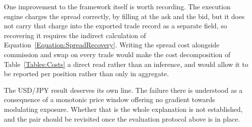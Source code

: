 One improvement to the framework itself is worth recording. The execution engine charges the spread correctly, by filling at the ask and the bid, but it does not carry that charge into the exported trade record as a separate field, so recovering it requires the indirect calculation of Equation~\ref{Equation:SpreadRecovery}. Writing the spread cost alongside commission and swap on every trade would make the cost decomposition of Table~\ref{Tables:Costs} a direct read rather than an inference, and would allow it to be reported per position rather than only in aggregate.

The USD/JPY result deserves its own line. The failure there is understood as a consequence of a monotonic price window offering no gradient towards modulating exposure. Whether that is the whole explanation is not established, and the pair should be revisited once the evaluation protocol above is in place.